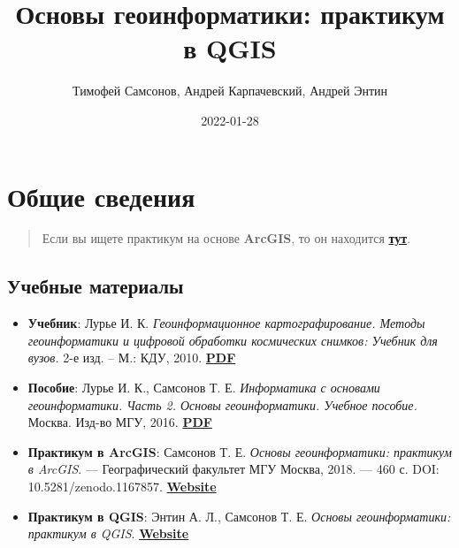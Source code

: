 \documentclass[
  12pt,
]{book}
\title{Основы геоинформатики: практикум в QGIS}
\author{Тимофей Самсонов, Андрей Карпачевский, Андрей Энтин}
\date{2022-01-28}
\begin{document}
\maketitle

{
\hypersetup{linkcolor=}
\setcounter{tocdepth}{1}
\tableofcontents
}
\hypertarget{ux43eux431ux449ux438ux435-ux441ux432ux435ux434ux435ux43dux438ux44f}{%
\chapter*{Общие сведения}\label{ux43eux431ux449ux438ux435-ux441ux432ux435ux434ux435ux43dux438ux44f}}

\begin{quote}
Если вы ищете практикум на основе \textbf{ArcGIS}, то он находится \href{https://tsamsonov.github.io/arcgis-course/}{\textbf{тут}}.
\end{quote}

\hypertarget{ux443ux447ux435ux431ux43dux44bux435-ux43cux430ux442ux435ux440ux438ux430ux43bux44b}{%
\section*{Учебные материалы}\label{ux443ux447ux435ux431ux43dux44bux435-ux43cux430ux442ux435ux440ux438ux430ux43bux44b}}

\begin{itemize}
\item
  \textbf{Учебник}: Лурье И. К. \emph{Геоинформационное картографирование. Методы геоинформатики и цифровой обработки космических снимков: Учебник для вузов.} 2-е изд. -- М.: КДУ, 2010. \href{https://istina.msu.ru/download/295728157/1jUpeD:roxrGk69x0LxZCpC5w_KNV0o390/}{\textbf{PDF}}
\item
  \textbf{Пособие}: Лурье И. К., Самсонов Т. Е. \emph{Информатика с основами геоинформатики. Часть 2. Основы геоинформатики. Учебное пособие.} Москва. Изд-во МГУ, 2016. \href{https://istina.msu.ru/download/45821659/1ej66u:uSUtcUS-XmdMMyRRpC-yflDmCv8/}{\textbf{PDF}}
\item
  \textbf{Практикум в ArcGIS}: Самсонов Т. Е. \emph{Основы геоинформатики: практикум в ArcGIS}. --- Географический факультет МГУ Москва, 2018. --- 460 с. DOI: 10.5281/zenodo.1167857. \href{https://tsamsonov.github.io/arcgis-course/}{\textbf{Website}}
\item
  \textbf{Практикум в QGIS}: Энтин А. Л., Самсонов Т. Е. \emph{Основы геоинформатики: практикум в QGIS}. \href{https://aentin.github.io/qgis-course/}{\textbf{Website}}
\end{itemize}
\end{document}
